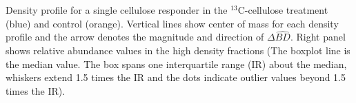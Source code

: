 Density profile for a single cellulose responder in the $^{13}$C-cellulose treatment (blue)
and control (orange). Vertical lines show center of mass for each density profile and the
arrow denotes the magnitude and direction of $\Delta\hat{BD}$. Right panel shows relative abundance
values in the high density fractions (The boxplot line is the median
value. The box spans one interquartile range (IR) about the median,
whiskers extend 1.5 times the IR and the dots indicate outlier values
beyond 1.5 times the IR). 

